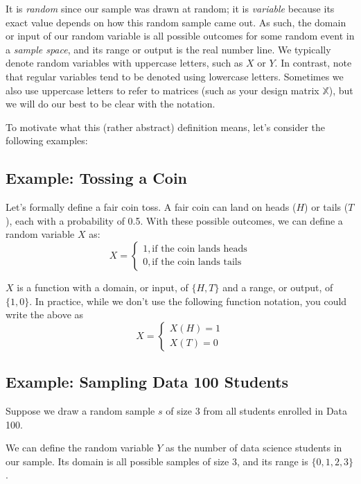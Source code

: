 \documentclass[
  letterpaper,
  DIV=11,
  numbers=noendperiod]{scrreprt}
\begin{document}
It is \emph{random} since our sample was drawn at random; it is
\emph{variable} because its exact value depends on how this random
sample came out. As such, the domain or input of our random variable is
all possible outcomes for some random event in a \emph{sample space},
and its range or output is the real number line. We typically denote
random variables with uppercase letters, such as \(X\) or \(Y\). In
contrast, note that regular variables tend to be denoted using lowercase
letters. Sometimes we also use uppercase letters to refer to matrices
(such as your design matrix \(\mathbb{X}\)), but we will do our best to
be clear with the notation.

To motivate what this (rather abstract) definition means, let's consider
the following examples:

\subsection{Example: Tossing a Coin}\label{example-tossing-a-coin}

Let's formally define a fair coin toss. A fair coin can land on heads
(\(H\)) or tails (\(T\)), each with a probability of 0.5. With these
possible outcomes, we can define a random variable \(X\) as:
\[X = \begin{cases} 
      1, \text{if the coin lands heads} \\
      0, \text{if the coin lands tails} 
   \end{cases}\]

\(X\) is a function with a domain, or input, of \(\{H, T\}\) and a
range, or output, of \(\{1, 0\}\). In practice, while we don't use the
following function notation, you could write the above as
\[X = \begin{cases}  X(H) = 1 \\ X(T) = 0 \end{cases}\]

\subsection{Example: Sampling Data 100
Students}\label{example-sampling-data-100-students}

Suppose we draw a random sample \(s\) of size 3 from all students
enrolled in Data 100.

We can define the random variable \(Y\) as the number of data science
students in our sample. Its domain is all possible samples of size 3,
and its range is \(\{0, 1, 2, 3\}\).
\end{document}
